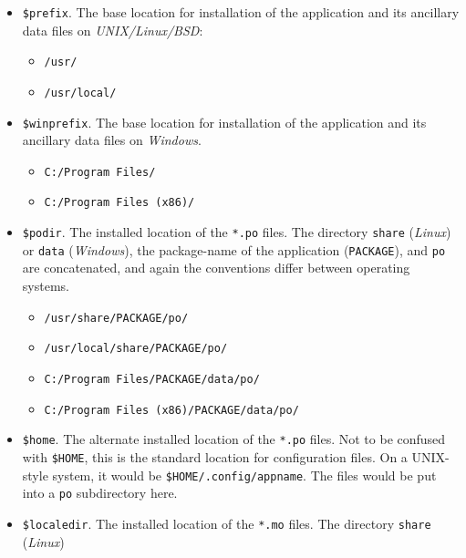 \documentclass[
 11pt,
 twoside,
 a4paper,
 final                                 %
]{article}
\begin{document}
   \begin{itemize}
      \item \texttt{\$prefix}. The base location for installation of
         the application and its ancillary data files on
         \textsl{UNIX/Linux/BSD}:
         \begin{itemize}
            \item \texttt{/usr/}
            \item \texttt{/usr/local/}
         \end{itemize}
      \item \texttt{\$winprefix}. The base location for installation of
         the application and its ancillary data files on \textsl{Windows}.
         \begin{itemize}
            \item \texttt{C:/Program Files/}
            \item \texttt{C:/Program Files (x86)/}
         \end{itemize}
      \item \texttt{\$podir}. The installed location of the \texttt{*.po}
         files.  The directory \texttt{share} (\textsl{Linux}) or
         \texttt{data} (\textsl{Windows}),
         the package-name of the application
         (\texttt{PACKAGE}), and \texttt{po} are concatenated,
         and again the conventions differ between operating systems.
         \begin{itemize}
            \item \texttt{/usr/share/PACKAGE/po/}
            \item \texttt{/usr/local/share/PACKAGE/po/}
            \item \texttt{C:/Program Files/PACKAGE/data/po/}
            \item \texttt{C:/Program Files (x86)/PACKAGE/data/po/}
         \end{itemize}
      \item \texttt{\$home}. The alternate installed
         location of the \texttt{*.po} files.
         Not to be confused with \texttt{\$HOME}, this is
         the standard location for configuration files.
         On a UNIX-style system, it would be \linebreak
         \texttt{\$HOME/.config/appname}.
         The files would be put into a \texttt{po} subdirectory here.
      \item \texttt{\$localedir}. The installed
         location of the \texttt{*.mo} files.
         The directory \texttt{share} (\textsl{Linux})

\end{itemize}
\end{document}
